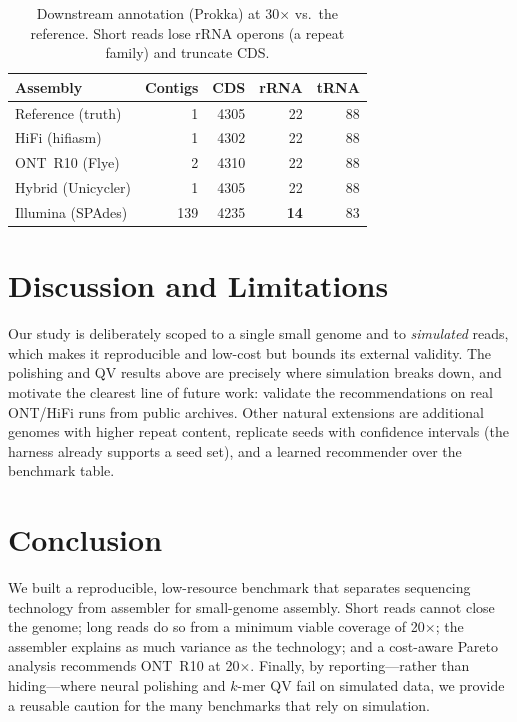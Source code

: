 \documentclass[runningheads]{llncs}
\begin{document}
\begin{table}[t]
\centering
\caption{Downstream annotation (Prokka) at 30$\times$ vs.\ the reference. Short
reads lose rRNA operons (a repeat family) and truncate CDS.}
\label{tab:downstream}
\begin{tabular}{lrrrr}
\toprule
Assembly & Contigs & CDS & rRNA & tRNA\\
\midrule
Reference (truth)     & 1   & 4305 & 22 & 88\\
HiFi (hifiasm)        & 1   & 4302 & 22 & 88\\
ONT~R10 (Flye)        & 2   & 4310 & 22 & 88\\
Hybrid (Unicycler)    & 1   & 4305 & 22 & 88\\
Illumina (SPAdes)     & 139 & 4235 & \textbf{14} & 83\\
\bottomrule
\end{tabular}
\end{table}

\section{Discussion and Limitations}
Our study is deliberately scoped to a single small genome and to
\emph{simulated} reads, which makes it reproducible and low-cost but bounds its
external validity. The polishing and QV results above are precisely where
simulation breaks down, and motivate the clearest line of future work:
validate the recommendations on real ONT/HiFi runs from public archives.
Other natural extensions are additional genomes with higher repeat content,
replicate seeds with confidence intervals (the harness already supports a seed
set), and a learned recommender over the benchmark table.

\section{Conclusion}
We built a reproducible, low-resource benchmark that separates sequencing
technology from assembler for small-genome assembly. Short reads cannot close
the genome; long reads do so from a minimum viable coverage of 20$\times$; the
assembler explains as much variance as the technology; and a cost-aware Pareto
analysis recommends ONT~R10 at 20$\times$. Finally, by reporting---rather than
hiding---where neural polishing and $k$-mer QV fail on simulated data, we
provide a reusable caution for the many benchmarks that rely on simulation.
\end{document}
